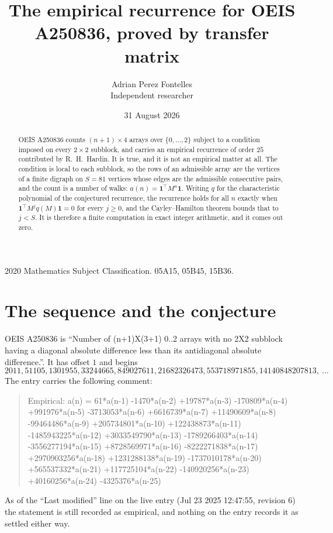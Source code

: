 \documentclass[11pt,a4paper]{article}
\title{The empirical recurrence for OEIS A250836, proved by transfer matrix}
\author{Adrian Perez Fontelles\\ \small Independent researcher}
\date{31 August 2026}
\theoremstyle{plain}
\theoremstyle{definition}
\begin{document}
\maketitle

\begin{abstract}
OEIS A250836 counts $(n+1)\times4$ arrays over $\{0,\dots,2\}$ subject to a condition imposed on
every $2\times2$ subblock, and carries an empirical recurrence of order $25$ contributed
by R.~H.~Hardin. It is true, and it is not an empirical matter at all. The condition is local
to each subblock, so the rows of an admissible array are the vertices of a finite digraph
on $S=81$ vertices whose edges are the admissible consecutive pairs, and the count is a
number of walks: $a(n)=\mathbf{1}^{\!\top}M^{n}\mathbf{1}$. Writing $q$
for the characteristic polynomial of the conjectured recurrence, the recurrence holds for all
$n$ exactly when $\mathbf{1}^{\!\top}M^{j}q(M)\mathbf{1}=0$ for every $j\ge0$, and the
Cayley--Hamilton theorem bounds that to $j<S$. It is therefore a finite computation in exact
integer arithmetic, and it comes out zero.
\end{abstract}

\noindent\small 2020 Mathematics Subject Classification. 05A15, 05B45, 15B36.\normalsize

\section{The sequence and the conjecture}

OEIS A250836 is ``Number of (n+1)X(3+1) 0..2 arrays with no 2X2 subblock having a diagonal absolute difference less than its antidiagonal absolute difference.''. It has offset $1$ and begins
\[
2011, 51105, 1301955, 33244665, 849027611, 21682326473, 553718971855, 14140848207813,\ \dots
\]
The entry carries the following comment:
\begin{quote}\small
Empirical: a(n) = 61*a(n-1) -1470*a(n-2) +19787*a(n-3) -170809*a(n-4) +991976*a(n-5) -3713053*a(n-6) +6616739*a(n-7) +11490609*a(n-8) -99464486*a(n-9) +205734801*a(n-10) +122438873*a(n-11) -1485943225*a(n-12) +3033549790*a(n-13) -1789266403*a(n-14) -3556277194*a(n-15) +8728569971*a(n-16) -8222271838*a(n-17) +2970903256*a(n-18) +1231288138*a(n-19) -1737010178*a(n-20) +565537332*a(n-21) +117725104*a(n-22) -140920256*a(n-23) +40160256*a(n-24) -4325376*a(n-25)
\end{quote}
As of the ``Last modified'' line on the live entry (Jul 23 2025 12:47:55, revision 6) the statement is
still recorded as empirical, and nothing on the entry records it as settled either way.
\end{document}
